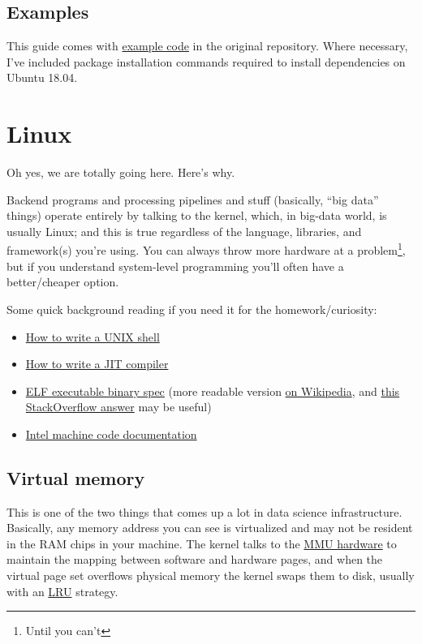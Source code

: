 \documentclass{article}
\newcommand{\lnk}[2]{\href{#1}{\textcolor[rgb]{1.0,0.0,0.0}{#2}}}
\begin{document}
  \subsection{Examples}
  This guide comes with
  \lnk{https://github.com/spencertipping/data-science-in-ten-minutes/tree/master/example}{example
  code} in the original repository. Where necessary, I've included package
  installation commands required to install dependencies on Ubuntu 18.04.

  \newpage
  \section{Linux}
  Oh yes, we are totally going here. Here's why.

  Backend programs and processing pipelines and stuff (basically, ``big data''
  things) operate entirely by talking to the kernel, which, in big-data world,
  is usually Linux; and this is true regardless of the language, libraries, and
  framework(s) you're using. You can always throw more hardware at a
  problem\footnote{Until you can't}, but if you understand system-level
  programming you'll often have a better/cheaper option.

  Some quick background reading if you need it for the homework/curiosity:

  \begin{itemize}
    \item \lnk{https://github.com/spencertipping/shell-tutorial}
              {How to write a UNIX shell}
    \item \lnk{https://github.com/spencertipping/jit-tutorial}
              {How to write a JIT compiler}
    \item \lnk{http://manpages.ubuntu.com/manpages/xenial/man5/elf.5.html}
              {ELF executable binary spec} (more readable version
              \lnk{https://en.wikipedia.org/wiki/Executable_and_Linkable_Format}
              {on Wikipedia}, and
              \lnk{https://stackoverflow.com/questions/2427011/what-is-the-difference-between-elf-files-and-bin-files}
                  {this StackOverflow answer} may be useful)
    \item \lnk{https://www.intel.com/content/dam/www/public/us/en/documents/manuals/64-ia-32-architectures-software-developer-instruction-set-reference-manual-325383.pdf}
              {Intel machine code documentation}
  \end{itemize}

  \subsection{Virtual memory}
  This is one of the two things that comes up a lot in data science
  infrastructure. Basically, any memory address you can see is virtualized and
  may not be resident in the RAM chips in your machine. The kernel talks to the
  \lnk{https://en.wikipedia.org/wiki/Memory_management_unit}{MMU hardware} to
  maintain the mapping between software and hardware pages, and when the virtual
  page set overflows physical memory the kernel swaps them to disk, usually with
  an \lnk{https://en.wikipedia.org/wiki/Cache_replacement_policies}{LRU}
  strategy.
\end{document}
